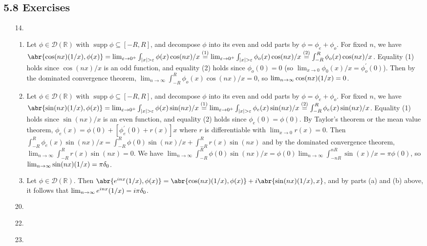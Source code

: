 \documentclass[11pt,leqno]{article}
\theoremstyle{plain}
\theoremstyle{definition}
\numberwithin{equation}{section}
\numberwithin{lem}{section}
\newcommand{\eq}[1]{\overset{(#1)}{=}}
\DeclareMathOperator{\supp}{supp}
\let\PV\relax
\DeclareMathOperator{\PV}{PV}
\begin{document}
\subsection*{5.8 Exercises}
\begin{enumerate}
    \item[14.] \begin{enumerate}
      \item Let $\phi\in \mathcal D(\mathbb R)$ with $\supp \phi\subseteq [-R,R]$, and decompose $\phi$ into its even and odd parts by $\phi = \phi_e + \phi_o$.
      For fixed $n$, we have $\abr{\cos(nx)\PV(1/x), \phi(x)}= \lim_{\varepsilon\to 0^+}\int_{\abs{x}>\varepsilon}\phi(x)\cos(nx)/x \eq{1} \lim_{\varepsilon\to 0^+}\int_{\abs{x}>\varepsilon}\phi_o(x)\allowbreak\cos(nx)/x \eq{2}\int_{-R}^{R}\phi_o(x)\cos(nx)/x$.
      Equality (1) holds since $\cos(nx)/x$ is an odd function, and equality (2) holds since $\phi_o(0) = 0$ (so $\lim_{x\to 0}\phi_0(x)/x = \phi_o^\prime(0)$). Then by the dominated convergence theorem, $\lim_{n\to\infty}\int_{-R}^{R}\phi_o(x)\cos(nx)/x = 0$, so $\lim_{n\to\infty}\cos(nx)\PV(1/x)= 0$.
      \item Let $\phi\in \mathcal D(\mathbb R)$ with $\supp \phi\subseteq [-R,R]$, and decompose $\phi$ into its even and odd parts by $\phi = \phi_e + \phi_o$.
      For fixed $n$, we have $\abr{\sin(nx)\PV(1/x), \phi(x)}= \lim_{\varepsilon\to 0^+}\int_{\abs{x}>\varepsilon}\phi(x)\sin(nx)/x\eq{1} \lim_{\varepsilon\to 0^+}\int_{\abs{x}>\varepsilon}\phi_e(x)\allowbreak\sin(nx)/x\eq{2} \int_{-R}^{R}\phi_e(x)\sin(nx)/x$. Equality (1) holds since $\sin(nx)/x$ is an even function, and equality (2) holds since $\phi_e(0) = \phi(0)$. By Taylor's theorem or the mean value theorem, $\phi_e(x) = \phi(0) + [\phi_e^\prime(0)+r(x)]x$ where $r$ is differentiable with $\lim_{x\to 0}r(x) = 0$. Then $\int_{-R}^{R}\phi_e(x)\sin(nx)/x = \int_{-R}^{R}\phi(0)\sin(nx)/x + \int_{-R}^{R}r(x)\sin(nx)$ and by the dominated convergence theorem, $\lim_{n\to\infty}\int_{-R}^{R}r(x)\sin(nx) = 0$. We have $\lim_{n\to\infty}\int_{-R}^{R}\phi(0)\sin(nx)/x = \phi(0)\lim_{n\to\infty}\int_{-nR}^{nR}\sin(x)/x = \pi\phi(0)$, so $\lim_{n\to\infty}\sin(nx)\PV(1/x)= \pi\delta_0$.
      \item Let $\phi\in \mathcal D(\mathbb R)$. Then $\abr{e^{inx}\PV(1/x),\phi(x)} = \abr{\cos(nx)\PV(1/x),\phi(x)} + i\abr{\sin(nx)\PV(1/x),x}$, and by parts (a) and (b) above, it follows that $\lim_{n\to\infty}e^{inx}\PV(1/x) = i\pi\delta_0$.
    \end{enumerate}
    \item[20.] 
    \item[22.] 
    \item[23.] 
\end{enumerate}
\end{document}
